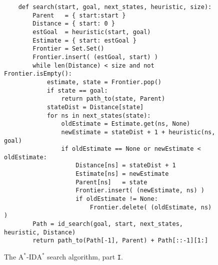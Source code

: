 \begin{figure}[!ht]
\centering
\begin{verbatim}
    def search(start, goal, next_states, heuristic, size):
        Parent   = { start:start }
        Distance = { start: 0 }           
        estGoal  = heuristic(start, goal)
        Estimate = { start: estGoal }
        Frontier = Set.Set()
        Frontier.insert( (estGoal, start) )
        while len(Distance) < size and not Frontier.isEmpty():
            estimate, state = Frontier.pop()
            if state == goal:
                return path_to(state, Parent)
            stateDist = Distance[state]
            for ns in next_states(state):
                oldEstimate = Estimate.get(ns, None)
                newEstimate = stateDist + 1 + heuristic(ns, goal)
                if oldEstimate == None or newEstimate < oldEstimate:
                    Distance[ns] = stateDist + 1
                    Estimate[ns] = newEstimate
                    Parent[ns]   = state
                    Frontier.insert( (newEstimate, ns) )
                    if oldEstimate != None:
                        Frontier.delete( (oldEstimate, ns) )
        Path = id_search(goal, start, next_states, heuristic, Distance)
        return path_to(Path[-1], Parent) + Path[::-1][1:]
\end{verbatim}
\vspace*{-0.3cm}
\caption{The $\mathrm{A}^*$-$\mathrm{IDA}^*$ search algorithm, part \texttt{I}.}
\label{fig:A-Star-Ida-Star.ipynb-1}
\end{figure}


